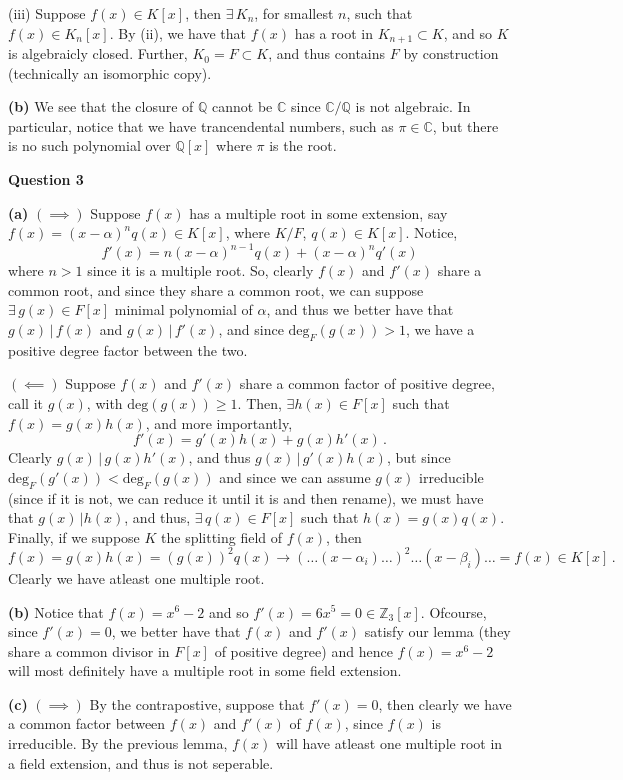 \documentclass[10pt]{article}
\newcommand{\Z}{\mathbb{Z}}
\newcommand{\Q}{\mathbb{Q}}
\newcommand{\C}{\mathbb{C}}
\begin{document}
(iii) Suppose $f(x) \in K[x]$, then $\exists\, K_{n}$, for smallest $n$, such that $f(x)\in K_{n}[x]$. By (ii), we have that $f(x)$ has a root in $K_{n+1}\subset K$, and so $K$ is algebraicly closed. Further, $K_{0} = F \subset K$, and thus contains $F$ by construction (technically an isomorphic copy).

\textbf{(b)} We see that the closure of $\Q$ cannot be $\C$ since $\C/\Q$ is not algebraic. In particular, notice that we have trancendental numbers, such as $\pi \in \C$, but there is no such polynomial over $\Q[x]$ where $\pi$ is the root.

\newpage
\textbf{Question 3}

\textbf{(a)} $(\implies)$ Suppose $f(x)$ has a multiple root in some extension, say $f(x) = (x-\alpha)^{n}q(x)\in K[x]$, where $K/F$, $q(x)\in K[x]$. Notice,
\[ f'(x) = n(x-\alpha)^{n-1}q(x) + (x-\alpha)^{n}q'(x)\]
where $n > 1$ since it is a multiple root. So, clearly $f(x)$ and $f'(x)$ share a common root, and since they share a common root, we can suppose $\exists\, g(x) \in F[x]$ minimal polynomial of $\alpha$, and thus we better have that $g(x)\, |\, f(x)$ and $g(x)\, |\, f'(x)$, and since $\text{deg}_{F}(g(x)) > 1$, we have a positive degree factor between the two.

$(\impliedby)$ Suppose $f(x)$ and $f'(x)$ share a common factor of positive degree, call it $g(x)$, with $\text{deg}(g(x)) \geq 1$. Then, $\exists h(x)\in F[x]$ such that $f(x) = g(x)h(x)$, and more importantly,
\[ f'(x) = g'(x)h(x) + g(x)h'(x) \, .\]
Clearly $g(x) \,| \,g(x)h'(x)$, and thus $g(x) \,|\, g'(x)h(x)$, but since $\text{deg}_{F}(g'(x)) < \text{deg}_{F}(g(x))$ and since we can assume $g(x)$ irreducible (since if it is not, we can reduce it until it is and then rename), we must have that $g(x)\, |h(x)$, and thus, $\exists\, q(x) \in F[x]$ such that $h(x) = g(x)q(x)$. Finally, if we suppose $K$ the splitting field of $f(x)$, then
\[ f(x) = g(x)h(x) = (g(x))^{2}q(x) \rightarrow (\dots(x-\alpha_{i})\dots)^{2}\dots(x-\beta_{i})\dots =f(x) \in K[x]\, . \]
Clearly we have atleast one multiple root.

\textbf{(b)} Notice that $f(x) = x^{6} - 2$ and so $f'(x) = 6x^{5} = 0 \in \Z_{3}[x]$. Ofcourse, since $f'(x) = 0$, we better have that $f(x)$ and $f'(x)$ satisfy our lemma (they share a common divisor in $F[x]$ of positive degree) and hence $f(x) = x^{6} - 2$ will most definitely have a multiple root in some field extension.

\textbf{(c)} $(\implies)$ By the contrapostive, suppose that $f'(x) = 0$, then clearly we have a common factor between $f(x)$ and $f'(x)$ of $f(x)$, since $f(x)$ is irreducible. By the previous lemma, $f(x)$ will have atleast one multiple root in a field extension, and thus is not seperable.
\end{document}
